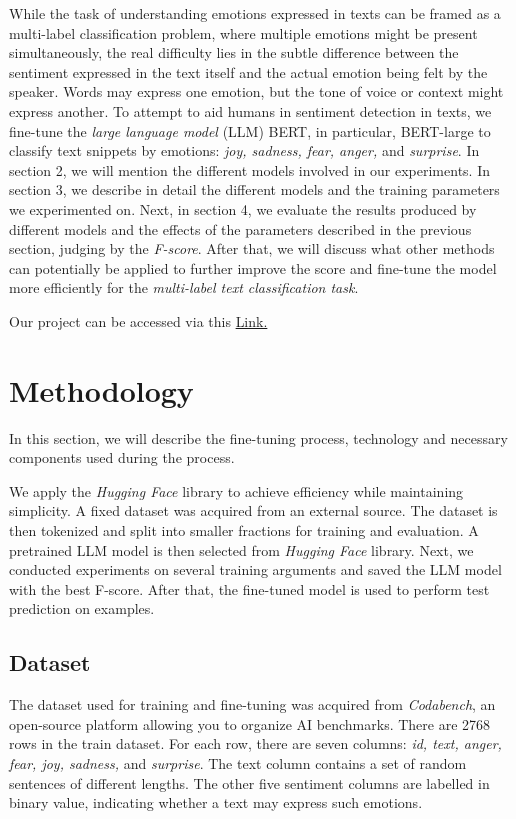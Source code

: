 \documentclass[11pt]{article}
\begin{document}
While the task of understanding emotions expressed in texts can be framed as a multi-label classification problem, where multiple emotions might be present simultaneously, the real difficulty lies in the subtle difference between the sentiment expressed in the text itself and the actual emotion being felt by the speaker. Words may express one emotion, but the tone of voice or context might express another. To attempt to aid humans in sentiment detection in texts, we fine-tune the \textit{large language model} (LLM) BERT, in particular, BERT-large to classify text snippets by emotions: \textit{joy, sadness, fear, anger,} and \textit{surprise}. In section 2, we will mention the different models involved in our experiments. In section 3, we describe in detail the different models and the training parameters we experimented on. Next, in section 4, we evaluate the results produced by different models and the effects of the parameters described in the previous section, judging by the \textit{F-score}. After that, we will discuss what other methods can potentially be applied to further improve the score and fine-tune the model more efficiently for the \textit{multi-label text classification task}.

Our project can be accessed via this \href{https://github.com/KomaR1/TUD_SemEval_a/tree/main}{Link.}

\section{Methodology}
In this section, we will describe the fine-tuning process, technology and necessary components used during the process.

We apply the \textit{Hugging Face} library to achieve efficiency while maintaining simplicity. A fixed dataset was acquired from an external source. The dataset is then tokenized and split into smaller fractions for training and evaluation. A pretrained LLM model is then selected from \textit{Hugging Face} library. Next, we conducted experiments on several training arguments and saved the LLM model with the best F-score. After that, the fine-tuned model is used to perform test prediction on examples.
\subsection{Dataset}
The dataset used for training and fine-tuning was acquired from \textit{Codabench}, an open-source platform allowing you to organize AI benchmarks. There are 2768 rows in the train dataset. For each row, there are seven columns: \textit{id, text, anger, fear, joy, sadness,} and \textit{surprise}. The text column contains a set of random sentences of different lengths. The other five sentiment columns are labelled in binary value, indicating whether a text may express such emotions.
\end{document}
